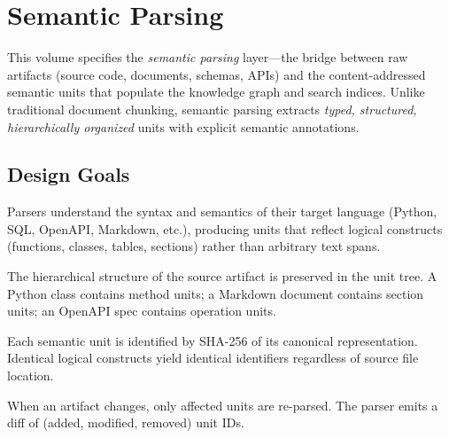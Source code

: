 \chapter{Semantic Parsing}
\label{cha:semantic-parsing}

This volume specifies the \emph{semantic parsing} layer---the bridge between raw artifacts (source code, documents, schemas, APIs) and the content-addressed semantic units that populate the knowledge graph and search indices. Unlike traditional document chunking, semantic parsing extracts \emph{typed, structured, hierarchically organized} units with explicit semantic annotations.

\section{Design Goals}
\label{sec:parsing:goals}

\begin{designprinciple}
Parsers understand the syntax and semantics of their target language (Python, SQL, OpenAPI, Markdown, etc.), producing units that reflect logical constructs (functions, classes, tables, sections) rather than arbitrary text spans.
\end{designprinciple}

\begin{designprinciple}
The hierarchical structure of the source artifact is preserved in the unit tree. A Python class contains method units; a Markdown document contains section units; an OpenAPI spec contains operation units.
\end{designprinciple}

\begin{designprinciple}
Each semantic unit is identified by SHA-256 of its canonical representation. Identical logical constructs yield identical identifiers regardless of source file location.
\end{designprinciple}

\begin{designprinciple}
When an artifact changes, only affected units are re-parsed. The parser emits a diff of (added, modified, removed) unit IDs.
\end{designprinciple}


